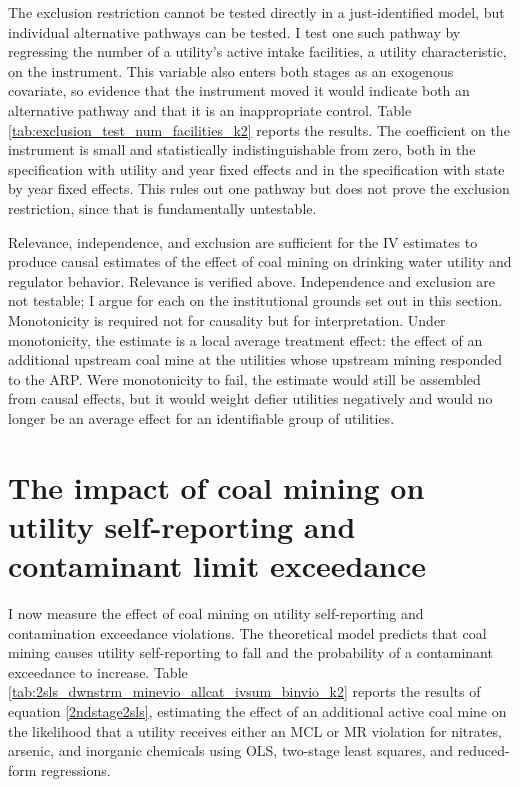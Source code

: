 \documentclass[12pt]{article}
\begin{document}
The exclusion restriction cannot be tested directly in a just-identified model, but individual alternative pathways can be tested. I test one such pathway by regressing the number of a utility's active intake facilities, a utility characteristic, on the instrument. This variable also enters both stages as an exogenous covariate, so evidence that the instrument moved it would indicate both an alternative pathway and that it is an inappropriate control. Table \ref{tab:exclusion_test_num_facilities_k2} reports the results. The coefficient on the instrument is small and statistically indistinguishable from zero, both in the specification with utility and year fixed effects and in the specification with state by year fixed effects. This rules out one pathway but does not prove the exclusion restriction, since that is fundamentally untestable.

Relevance, independence, and exclusion are sufficient for the IV estimates to produce causal estimates of the effect of coal mining on drinking water utility and regulator behavior. Relevance is verified above. Independence and exclusion are not testable; I argue for each on the institutional grounds set out in this section. Monotonicity is required not for causality but for interpretation. Under monotonicity, the estimate is a local average treatment effect: the effect of an additional upstream coal mine at the utilities whose upstream mining responded to the ARP. Were monotonicity to fail, the estimate would still be assembled from causal effects, but it would weight defier utilities negatively and would no longer be an average effect for an identifiable group of utilities.

\section{The impact of coal mining on utility self-reporting and contaminant limit exceedance}\label{sec:violations}

I now measure the effect of coal mining on utility self-reporting and contamination exceedance violations. The theoretical model predicts that coal mining causes utility self-reporting to fall and the probability of a contaminant exceedance to increase. Table \ref{tab:2sls_dwnstrm_minevio_allcat_ivsum_binvio_k2} reports the results of equation \ref{2ndstage2sls}, estimating the effect of an additional active coal mine on the likelihood that a utility receives either an MCL or MR violation for nitrates, arsenic, and inorganic chemicals using OLS, two-stage least squares, and reduced-form regressions.
\end{document}
